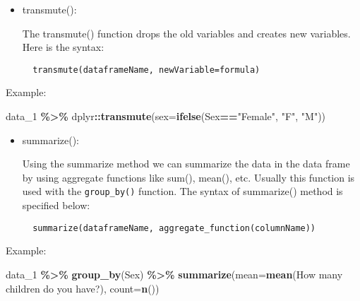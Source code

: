 \documentclass[
]{book}
\newenvironment{Shaded}{\begin{snugshade}}{\end{snugshade}}
\newcommand{\AttributeTok}[1]{\textcolor[rgb]{0.13,0.29,0.53}{#1}}
\newcommand{\FunctionTok}[1]{\textcolor[rgb]{0.13,0.29,0.53}{\textbf{#1}}}
\newcommand{\NormalTok}[1]{#1}
\newcommand{\SpecialCharTok}[1]{\textcolor[rgb]{0.81,0.36,0.00}{\textbf{#1}}}
\newcommand{\StringTok}[1]{\textcolor[rgb]{0.31,0.60,0.02}{#1}}
\begin{document}
\begin{itemize}
\item
  transmute():

  The transmute() function drops the old variables and creates new variables. Here is the syntax:

\begin{verbatim}
  transmute(dataframeName, newVariable=formula)
\end{verbatim}
\end{itemize}

Example:

\begin{Shaded}
\begin{Highlighting}[]
\NormalTok{data\_1 }\SpecialCharTok{\%\textgreater{}\%}
\NormalTok{  dplyr}\SpecialCharTok{::}\FunctionTok{transmute}\NormalTok{(}\AttributeTok{sex=}\FunctionTok{ifelse}\NormalTok{(Sex}\SpecialCharTok{==}\StringTok{"Female"}\NormalTok{, }\StringTok{"F"}\NormalTok{, }\StringTok{"M"}\NormalTok{))}
\end{Highlighting}
\end{Shaded}

\begin{itemize}
\item
  summarize():

  Using the summarize method we can summarize the data in the data frame by using aggregate functions like sum(), mean(), etc. Usually this function is used with the \texttt{group\_by()} function. The syntax of summarize() method is specified below:

\begin{verbatim}
  summarize(dataframeName, aggregate_function(columnName))
\end{verbatim}
\end{itemize}

Example:

\begin{Shaded}
\begin{Highlighting}[]
\NormalTok{data\_1 }\SpecialCharTok{\%\textgreater{}\%}
  \FunctionTok{group\_by}\NormalTok{(Sex) }\SpecialCharTok{\%\textgreater{}\%}
  \FunctionTok{summarize}\NormalTok{(}\AttributeTok{mean=}\FunctionTok{mean}\NormalTok{(}\StringTok{\textasciigrave{}}\AttributeTok{How many children do you have?}\StringTok{\textasciigrave{}}\NormalTok{), }\AttributeTok{count=}\FunctionTok{n}\NormalTok{())}
\end{Highlighting}
\end{Shaded}
\end{document}
